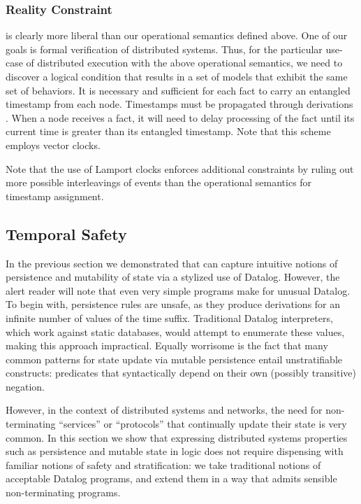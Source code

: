 
\subsubsection{Reality Constraint}

 is clearly more liberal than our operational semantics defined above.  One of our goals is formal verification of distributed systems.  Thus, for the particular use-case of distributed execution with the above operational semantics, we need to discover a logical condition that results in a set of models that exhibit the same set of behaviors.  It is  necessary and sufficient for each fact to carry an entangled timestamp from each node.  Timestamps must be propagated through derivations .  When a node receives a fact, it will need to delay processing of the fact until its current time is greater than its entangled timestamp.  Note that this scheme employs vector clocks.

Note that the use of Lamport clocks enforces additional constraints by ruling out more possible interleavings of events than the operational semantics for timestamp assignment. 

\subsection{Temporal Safety}

In the previous section we demonstrated that \slang can capture
intuitive notions of persistence and mutability of state via a
stylized use of Datalog.  However, the alert reader will note that
even very simple \slang programs make for unusual Datalog.
To begin with, persistence rules are unsafe, as they produce derivations for an infinite number
of values of the time suffix.  Traditional Datalog interpreters, which
work against static databases, would attempt to enumerate these
values, making this approach impractical.
Equally worrisome is the fact that many common patterns for state update via mutable
persistence entail unstratifiable constructs: predicates that syntactically depend on their
own (possibly transitive) negation.  

However, in the context of distributed systems and networks, the need
for non-terminating ``services'' or ``protocols'' that continually update their
state
is very common.  In this section we show that expressing distributed systems properties
such as persistence and mutable state in logic does not require
dispensing with familiar notions of safety and stratification: we take
traditional notions of acceptable Datalog programs, and extend them in
a way that admits sensible non-terminating programs.

